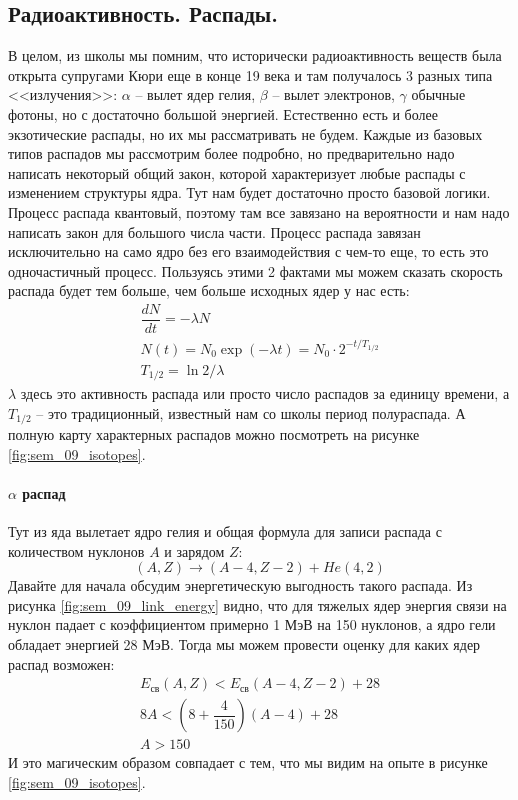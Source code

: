 \documentclass[12pt]{article}
\begin{document}
\subsection{Радиоактивность. Распады.}
В целом, из школы мы помним, что исторически радиоактивность веществ была открыта супругами Кюри еще в конце 19 века и там получалось 3 разных типа <<излучения>>: $\alpha$ -- вылет ядер гелия, $\beta$ -- вылет электронов,  $\gamma$ обычные фотоны, но с достаточно большой энергией. Естественно есть и более экзотические распады, но их мы рассматривать не будем. Каждые из базовых типов распадов мы рассмотрим более подробно, но предварительно надо написать некоторый общий закон, которой характеризует любые распады с изменением структуры ядра. Тут нам будет достаточно просто базовой логики. Процесс распада квантовый, поэтому там все завязано на вероятности и нам надо написать закон для большого числа части. Процесс распада завязан исключительно на само ядро без его взаимодействия с чем-то еще, то есть это одночастичный процесс. Пользуясь этими 2 фактами мы можем сказать скорость распада будет тем больше, чем больше исходных ядер у нас есть:
\begin{gather*}
\dfrac{dN}{dt} = -\lambda N\\
N(t) = N_0 \exp{(-\lambda t)} = N_0\cdot 2^{-t/T_{1/2}}\\
T_{1/2} = \ln{2} / \lambda
\end{gather*}
$\lambda$ здесь это активность распада или просто число распадов за единицу времени, а $T_{1/2}$ -- это традиционный, известный нам со школы период полураспада. А полную карту характерных распадов можно посмотреть на рисунке \ref{fig:sem_09_isotopes}.

\paragraph{$\alpha$ распад}
Тут из яда вылетает ядро гелия и общая формула для записи распада с количеством нуклонов $A$ и зарядом $Z$: 
\begin{equation*}
    (A,Z) \rightarrow (A-4, Z-2) + He(4,2)
\end{equation*}
Давайте для начала обсудим энергетическую выгодность такого распада. Из рисунка \ref{fig:sem_09_link_energy} видно, что для тяжелых ядер энергия связи на нуклон падает с коэффициентом примерно 1 МэВ на 150 нуклонов, а ядро гели обладает энергией 28 МэВ. Тогда мы можем провести оценку для каких ядер распад возможен:
\begin{gather*}
    E_{\text{св}}(A, Z) < E_{\text{св}}(A-4, Z-2) +28\\
    8A < \left (8 + \dfrac{4}{150} \right) (A-4) + 28\\
    A > 150
\end{gather*}
И это магическим образом совпадает с тем, что мы видим на опыте в рисунке \ref{fig:sem_09_isotopes}. 
\end{document}
